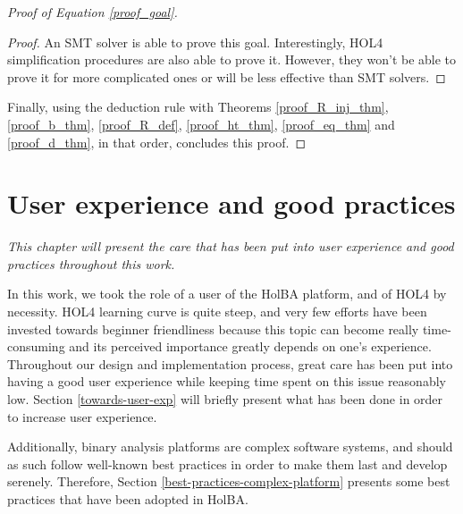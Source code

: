 \documentclass{kththesis}
\begin{document}
{\begin{proof}[Proof of Equation \ref{proof_goal}]
\begin{proof}
An \gls{SMT} solver is able to prove this goal. Interestingly, HOL4 simplification procedures are also able to prove it. However, they won't be able to prove it for more complicated ones or will be less effective than SMT solvers.
\end{proof} %

Finally, using the deduction rule with Theorems \ref{proof_R_inj_thm}, \ref{proof_b_thm}, \ref{proof_R_def}, \ref{proof_ht_thm}, \ref{proof_eq_thm} and \ref{proof_d_thm}, in that order, concludes this proof.
\renewcommand\qedsymbol{$\blacksquare$}
\end{proof}

\chapter{User experience and good practices} \label{user-friendliness}
\vspace{-1cm}
\textit{This chapter will present the care that has been put into user experience and good practices throughout this work.}

%


In this work, we took the role of a user of the HolBA platform, and of HOL4 by necessity. HOL4 learning curve is quite steep, and very few efforts have been invested towards beginner friendliness because this topic can become really time-consuming and its perceived importance greatly depends on one's experience. Throughout our design and implementation process, great care has been put into having a good user experience while keeping time spent on this issue reasonably low. Section \ref{towards-user-exp} will briefly present what has been done in order to increase user experience.

Additionally, binary analysis platforms are complex software systems, and should as such follow well-known best practices in order to make them last and develop serenely. Therefore, Section \ref{best-practices-complex-platform} presents some best practices that have been adopted in HolBA.

}
\end{document}
